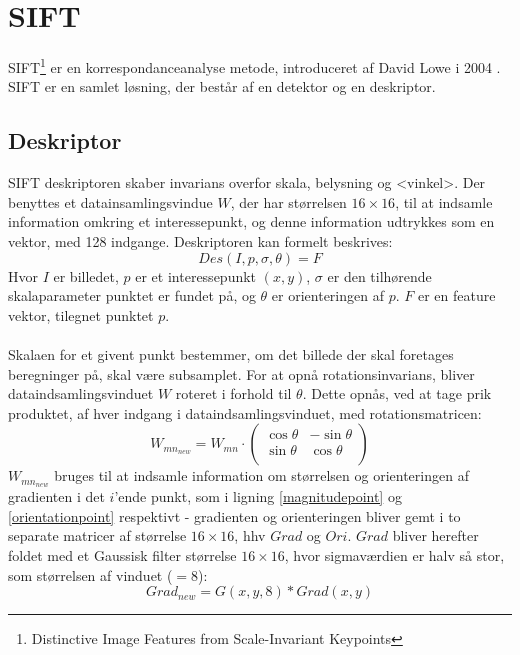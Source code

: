 \section{SIFT}
SIFT\footnote{Distinctive Image Features
from Scale-Invariant Keypoints} er en korrespondanceanalyse metode, introduceret af David Lowe i 2004 \cite{SIFT}. SIFT er en samlet løsning, der består af en detektor og en deskriptor.


\subsection{Deskriptor}
SIFT deskriptoren skaber invarians overfor skala, belysning og <vinkel>. Der benyttes et datainsamlingsvindue $W$, der har størrelsen $16 \times 16$, til at indsamle information omkring et interessepunkt, og denne information udtrykkes som en vektor, med 128 indgange. Deskriptoren kan formelt beskrives:
\begin{equation}
Des(I, p,\sigma,\theta) = F
\end{equation}
Hvor $I$ er billedet, $p$ er et interessepunkt $(x,y)$, $\sigma$ er den tilhørende skalaparameter punktet er fundet på, og $\theta$ er orienteringen af $p$. $F$ er en feature vektor, tilegnet punktet $p$.
\\
\\
Skalaen for et givent punkt bestemmer, om det billede der skal foretages beregninger på, skal være subsamplet. For at opnå rotationsinvarians, bliver dataindsamlingsvinduet $W$ roteret i forhold til $\theta$. Dette opnås, ved at tage prik produktet, af hver indgang i dataindsamlingsvinduet, med rotationsmatricen:
\begin{equation}
W_{{mn}_{new}} = W_{mn} \cdot
\begin{pmatrix}
  \cos \theta & -\sin \theta \\
  \sin \theta & \cos \theta  \\
\end{pmatrix}
\label{rotaionmatrix}
\end{equation}
$W_{{mn}_{new}}$ bruges til at indsamle information om størrelsen og orienteringen af gradienten i det $i$'ende punkt, som i ligning \eqref{magnitudepoint} og \eqref{orientationpoint} respektivt - gradienten og orienteringen bliver gemt i to separate matricer af størrelse $16\times16$, hhv $Grad$ og $Ori$. $Grad$ bliver herefter foldet med et Gaussisk filter størrelse $16\times16$, hvor sigmaværdien er halv så stor, som størrelsen af vinduet ($=8$):
\begin{equation}
Grad_{new} = G(x,y,8) * Grad(x,y)
\label{gradientsmooth}
\end{equation}

